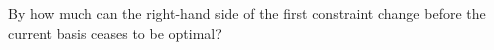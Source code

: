 By how much can the right-hand side of the first constraint change before the current basis ceases to be optimal?

\begin{solution}
  \ \\
  \vfill
\end{solution}
